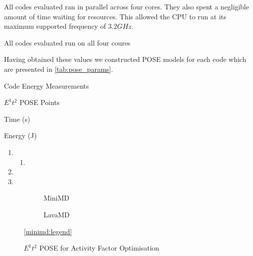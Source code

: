 All codes evaluated ran in parallel across four cores.
They also spent a negligible amount of time waiting for resources. 
This allowed the CPU to run at its maximum supported frequency of $3.2GHz$.



All codes evaluated run on all four coures 


Having obtained these values we constructed POSE models for each code which are presented in \autoref{tab:pose_params}.
\begin{table}
\centering
\caption{Code Energy Measurements}
\label{tab:code_metrics}

\end{table}

\begin{table}
  \setlength{\tabcolsep}{.5em}
  \caption{$E^1t^2$ POSE Points}
  \begin{subtable}{\textwidth}
  \centering
  \caption{Time (s)}
  
  \end{subtable}
  \begin{subtable}{\textwidth}
  \centering
  \caption{Energy (J)}
  
  \end{subtable}
  \label{tab:pose_params}
\end{table}



\clearpage

\begin{enumerate}
  \item {}
  \begin{enumerate}
    \item {}
  \end{enumerate}
  \item {}
  \item {}
\end{enumerate}



\begin{figure}[t]%
  \providecommand{\plotwidth}{.95\linewidth}
  \begin{subfigure}[t]{.5\linewidth}%
    \caption{MiniMD}%
  \end{subfigure}%
  \begin{subfigure}[t]{.5\linewidth}%
    \caption{LavaMD}%
  \end{subfigure}%
  \begin{center}%
    \ref{minimd:legend}%
  \end{center}%
  \caption{$E^1t^2$ POSE for Activity Factor Optimisation}%
  \label{fig:minimd}%
\end{figure}


